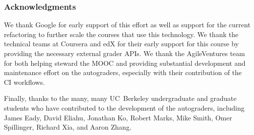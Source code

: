 \subsubsection*{Acknowledgments}  %

We thank  Google for early support of this effort as well as support
for the current refactoring to further scale the courses that use this
technology. 
We thank the technical teams at Coursera and edX for their  early
support for this course by providing the necessary external grader APIs.
We thank the AgileVentures team for both helping steward the MOOC and
providing substantial development and maintenance effort on the
autograders, especially with their contribution of the CI workflows.

Finally, thanks to the many, many UC~Berkeley undergraduate and graduate
students who have contributed to the development of the autograders,
including
James Eady, 
David Eliahu, 
Jonathan Ko, 
Robert Marks,
Mike Smith,
Omer Spillinger,
Richard Xia, 
and
Aaron Zhang.
